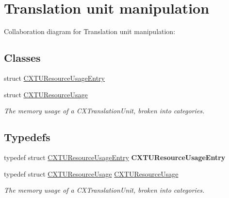 \hypertarget{group__CINDEX__TRANSLATION__UNIT}{}\section{Translation unit manipulation}
\label{group__CINDEX__TRANSLATION__UNIT}
Collaboration diagram for Translation unit manipulation\+:
\subsection*{Classes}
\begin{DoxyCompactItemize}
\item 
struct \hyperlink{structCXTUResourceUsageEntry}{C\+X\+T\+U\+Resource\+Usage\+Entry}
\item 
struct \hyperlink{structCXTUResourceUsage}{C\+X\+T\+U\+Resource\+Usage}
\begin{DoxyCompactList}\small\item\em The memory usage of a C\+X\+Translation\+Unit, broken into categories. \end{DoxyCompactList}\end{DoxyCompactItemize}
\subsection*{Typedefs}
\begin{DoxyCompactItemize}
\item 
\mbox{\label{group__CINDEX__TRANSLATION__UNIT_ga32223514671dc2bd33d209f0b0151383}} 
typedef struct \hyperlink{structCXTUResourceUsageEntry}{C\+X\+T\+U\+Resource\+Usage\+Entry} {\bfseries C\+X\+T\+U\+Resource\+Usage\+Entry}
\item 
\mbox{\label{group__CINDEX__TRANSLATION__UNIT_gae738c4f5e575afa14cc080ca27050ba6}} 
typedef struct \hyperlink{structCXTUResourceUsage}{C\+X\+T\+U\+Resource\+Usage} \hyperlink{group__CINDEX__TRANSLATION__UNIT_gae738c4f5e575afa14cc080ca27050ba6}{C\+X\+T\+U\+Resource\+Usage}
\begin{DoxyCompactList}\small\item\em The memory usage of a C\+X\+Translation\+Unit, broken into categories. \end{DoxyCompactList}\end{DoxyCompactItemize}
